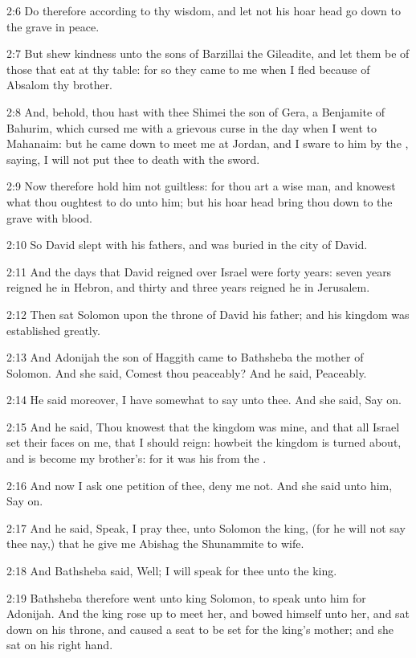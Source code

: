 2:6 Do therefore according to thy wisdom, and let not his hoar head go down to the grave in peace.

2:7 But shew kindness unto the sons of Barzillai the Gileadite, and let them be of those that eat at thy table: for so they came to me when I fled because of Absalom thy brother.

2:8 And, behold, thou hast with thee Shimei the son of Gera, a Benjamite of Bahurim, which cursed me with a grievous curse in the day when I went to Mahanaim: but he came down to meet me at Jordan, and I sware to him by the \LORD, saying, I will not put thee to death with the sword.

2:9 Now therefore hold him not guiltless: for thou art a wise man, and knowest what thou oughtest to do unto him; but his hoar head bring thou down to the grave with blood.

2:10 So David slept with his fathers, and was buried in the city of David.

2:11 And the days that David reigned over Israel were forty years: seven years reigned he in Hebron, and thirty and three years reigned he in Jerusalem.

2:12 Then sat Solomon upon the throne of David his father; and his kingdom was established greatly.

2:13 And Adonijah the son of Haggith came to Bathsheba the mother of Solomon. And she said, Comest thou peaceably? And he said, Peaceably.

2:14 He said moreover, I have somewhat to say unto thee. And she said, Say on.

2:15 And he said, Thou knowest that the kingdom was mine, and that all Israel set their faces on me, that I should reign: howbeit the kingdom is turned about, and is become my brother's: for it was his from the \LORD.

2:16 And now I ask one petition of thee, deny me not. And she said unto him, Say on.

2:17 And he said, Speak, I pray thee, unto Solomon the king, (for he will not say thee nay,) that he give me Abishag the Shunammite to wife.

2:18 And Bathsheba said, Well; I will speak for thee unto the king.

2:19 Bathsheba therefore went unto king Solomon, to speak unto him for Adonijah. And the king rose up to meet her, and bowed himself unto her, and sat down on his throne, and caused a seat to be set for the king's mother; and she sat on his right hand.

